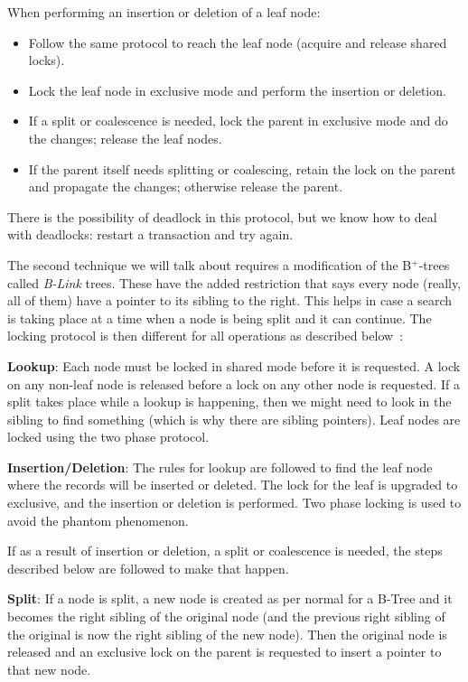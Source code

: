 When performing an insertion or deletion of a leaf node:
\begin{itemize}
	\item Follow the same protocol to reach the leaf node (acquire and release shared locks).
	\item Lock the leaf node in exclusive mode and perform the insertion or deletion.
	\item If a split or coalescence is needed, lock the parent in exclusive mode and do the changes; release the leaf nodes.
	\item If the parent itself needs splitting or coalescing, retain the lock on the parent and propagate the changes; otherwise release the parent.
\end{itemize}

There is the possibility of deadlock in this protocol, but we know how to deal with deadlocks: restart a transaction and try again.


The second technique we will talk about requires a modification of the B$^{+}$-trees called \textit{B-Link} trees. These have the added restriction that says every node (really, all of them) have a pointer to its sibling to the right. This helps in case a search is taking place at a time when a node is being split and it can continue. The locking protocol is then different for all operations as described below~\cite{dsc}:

\textbf{Lookup}: Each node must be locked in shared mode before it is requested. A lock on any non-leaf node is released before a lock on any other node is requested. If a split takes place while a lookup is happening, then we might need to look in the sibling to find something (which is why there are sibling pointers). Leaf nodes are locked using the two phase protocol.

\textbf{Insertion/Deletion}: The rules for lookup are followed to find the leaf node where the records will be inserted or deleted. The lock for the leaf is upgraded to exclusive, and the insertion or deletion is performed. Two phase locking is used to avoid the phantom phenomenon.

If as a result of insertion or deletion, a split or coalescence is needed, the steps described below are followed to make that happen.

\textbf{Split}: If a node is split, a new node is created as per normal for a B-Tree and it becomes the right sibling of the original node (and the previous right sibling of the original is now the right sibling of the new node). Then the original node is released and an exclusive lock on the parent is requested to insert a pointer to that new node.

